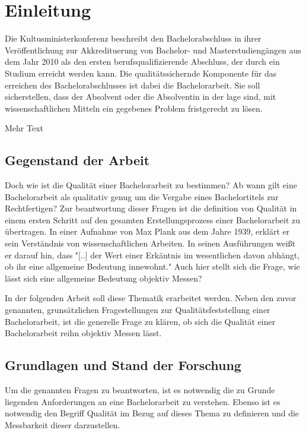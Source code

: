 
\chapter{Einleitung}
Die Kultusministerkonferenz beschreibt den Bachelorabschluss in ihrer Veröffentlichung zur Akkredituerung von Bachelor- und Masterstudiengängen aus dem Jahr 2010 als den ersten berufsqualifizierende Abschluss, der durch ein Studium erreicht werden kann. Die qualitätssichernde Komponente für das erreichen des Bachelorabschlusses ist dabei die Bachelorarbeit. Sie soll sicherstellen, dass der Absolvent oder die Absolventin in der lage sind, mit wissenschaftlichen Mitteln ein gegebenes Problem fristgerecht zu lösen.\cite[Vgl.][S.4]{kmk:2010}

Mehr Text


\section{Gegenstand der Arbeit}
Doch wie ist die Qualität einer Bachelorarbeit zu bestimmen? Ab wann gilt eine Bachelorarbeit als qualitativ genug um die Vergabe eines Bachelortitels zur Rechtfertigen? Zur beantwortung dieser Fragen ist die definition von Qualität in einem ersten Schritt auf den gesamten Erstellungsprozess einer Bachelorarbeit zu übertragen. 
In einer Aufnahme von Max Plank aus dem Jahre 1939, erklärt er sein Verständnis von wissenschaftlichen Arbeiten. In seinen Ausführungen weißt er darauf hin, dass "[..]  der Wert einer Erkäntnis im wesentlichen davon abhängt, ob ihr eine allgemeine Bedeutung innewohnt."\cite{Herneck:1976}
Auch hier stellt sich die Frage, wie lässt sich eine allgemeine Bedeutung objektiv Messen? 

In der folgenden Arbeit soll diese Thematik erarbeitet werden. Neben den zuvor genannten, grunsätzlichen Fragestellungen zur Qualitätsfeststellung einer Bachelorarbeit, ist die generelle Frage zu klären, ob sich die Qualität einer Bachelorarbeit reihn objektiv Messen lässt. 


\section{Grundlagen und Stand der Forschung}
Um die genannten Fragen zu beantworten, ist es notwendig die zu Grunde liegenden Anforderungen an eine Bachelorarbeit zu verstehen. Ebenso ist es notwendig den Begriff Qualität im Bezug auf dieses Thema zu definieren und die Messbarkeit dieser darzustellen.  
